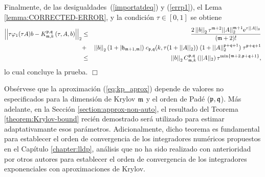 Finalmente, de las desigualdades~(\ref{importatdeq}) y (\ref{errp1}), el Lema \ref{lemma:CORRECTED-ERROR}, y la condición $\tau \in [0,1]$ se obtiene
\begin{eqnarray*}
	\left\lvert\left\lvert  \tau \varphi_1(\tau A)b-  K_{\mathfrak{m},k}^{\mathfrak{p},\mathfrak{q}}\left( \tau,  A , b \right)\right\rvert\right\rvert_2
	&\leq& \frac{2 \left\lvert \left\lvert b \right\rvert \right\rvert_2 \tau^{\mathfrak{m}+2}  \vert\lvert A\rvert\rvert^{\mathfrak{m}+1}_2
		\mathrm{e}^{\tau \lvert\lvert A\rvert\rvert_2}}{(\mathfrak{m}+2)!}\\
	&+&
	\left\lvert \left\lvert b \right\rvert \right\rvert_2 (1+\lvert\mathfrak{h}_{\mathfrak{m}+1,\mathfrak{m}}\rvert) \; c_{\mathfrak{p},\mathfrak{q}}(k,\tau (1+\lvert\lvert A \rvert\rvert_2))
	\; (1 + \lvert\lvert A \rvert\rvert_2^{\mathfrak{p}+\mathfrak{q}+1}) \; \tau^{\mathfrak{p}+\mathfrak{q}+1}\\
	& \leq & \left\lvert \left\lvert b \right\rvert \right\rvert_2 C_{\mathfrak{m},k}^{\mathfrak{p},\mathfrak{q}}\left(\lvert\lvert A \rvert\rvert_2\right)\tau^{\mathrm{min}\left\{ \mathfrak{m}+2,\mathfrak{p}+\mathfrak{q}+1 \right\}},
\end{eqnarray*}
lo cual concluye la prueba.
$\Box$

Obsérvese que la aproximación (\ref{eq:kp_aprox}) depende de valores no especificados para la dimensión de Krylov $\mathfrak{m}$ y el orden de Padé ($\mathfrak{p},\mathfrak{q}$). Más adelante, en la Sección \ref{section:approx-non-auto}, el resultado del Teorema \ref{theorem:Krylov-bound} recién demostrado será utilizado para estimar adaptativamante esos parámetros. Adicionalmente, dicho teorema es fundamental para establecer el orden de convergencia de los integradores numéricos propuestos en el Capítulo \ref{chapter:lldp}, análisis que no ha sido realizado con anterioridad por otros autores para establecer el orden de convergencia de los integradores exponenciales con aproximaciones de Krylov.

